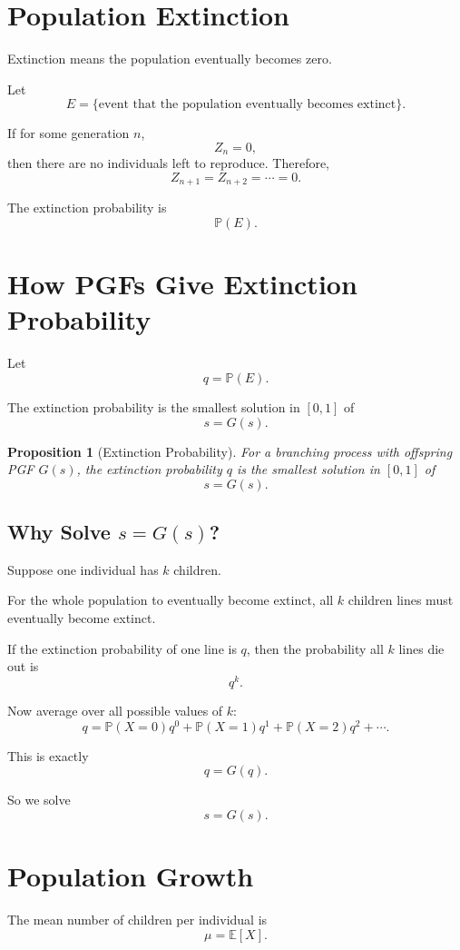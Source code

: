\documentclass[12pt,a4paper]{article}
\theoremstyle{notestyle}
\newtheorem{proposition}{Proposition}
\newcommand{\Prob}{\mathbb{P}}
\newcommand{\E}{\mathbb{E}}
\begin{document}
\section{Population Extinction}

Extinction means the population eventually becomes zero.

Let
\[
E=\{\text{event that the population eventually becomes extinct}\}.
\]

If for some generation $n$,
\[
Z_n=0,
\]
then there are no individuals left to reproduce. Therefore,
\[
Z_{n+1}=Z_{n+2}=\cdots=0.
\]

The extinction probability is
\[
\Prob(E).
\]

\section{How PGFs Give Extinction Probability}

Let
\[
q=\Prob(E).
\]

The extinction probability is the smallest solution in $[0,1]$ of
\[
s=G(s).
\]

\begin{proposition}[Extinction Probability]
For a branching process with offspring PGF $G(s)$, the extinction probability $q$ is the smallest solution in $[0,1]$ of
\[
s=G(s).
\]
\end{proposition}

\subsection*{Why Solve $s=G(s)$?}

Suppose one individual has $k$ children.

For the whole population to eventually become extinct, all $k$ children lines must eventually become extinct.

If the extinction probability of one line is $q$, then the probability all $k$ lines die out is
\[
q^k.
\]

Now average over all possible values of $k$:
\[
q=\Prob(X=0)q^0+\Prob(X=1)q^1+\Prob(X=2)q^2+\cdots.
\]

This is exactly
\[
q=G(q).
\]

So we solve
\[
s=G(s).
\]

\section{Population Growth}

The mean number of children per individual is
\[
\mu=\E[X].
\]
\end{document}
